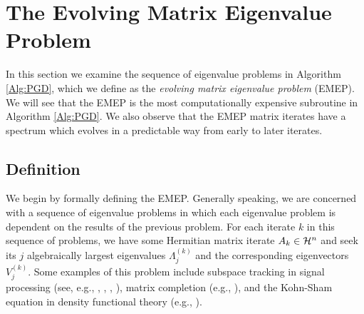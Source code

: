 \section{The Evolving Matrix Eigenvalue Problem}		\label{Subsec:evol_mats-spectral_props}


In this section we examine the sequence of eigenvalue problems in Algorithm \ref{Alg:PGD}, which we define as the \textit{evolving matrix eigenvalue problem} (EMEP).
We will see that the EMEP is the most computationally expensive subroutine in Algorithm \ref{Alg:PGD}.  
We also observe that the EMEP matrix iterates have a spectrum which evolves in a predictable way from early to later iterates.




\subsection{Definition} 	\label{Subsubsec:evol_mats-EMEP_definition}


We begin by formally defining the EMEP.
Generally speaking, we are concerned with a sequence of eigenvalue problems in which each eigenvalue problem is dependent on the results of the previous problem.  
For each iterate $k$ in this sequence of problems, we have some Hermitian matrix iterate $A_k \in {\mathcal H}^n$ and seek its $j$ algebraically largest eigenvalues $\Lambda^{(k)}_j$ and the corresponding eigenvectors $V^{(k)}_j$.  
Some examples of this problem include subspace tracking in signal processing (see, e.g., \cite{comon1990tracking}, \cite{stewart1992updating}, \cite{yang1995projection}, \cite{doukopoulos2008fast}), matrix completion (e.g., \cite{ngo2012scaled}), and the Kohn-Sham equation in density functional theory (e.g., \cite{saad2010numerical}).



